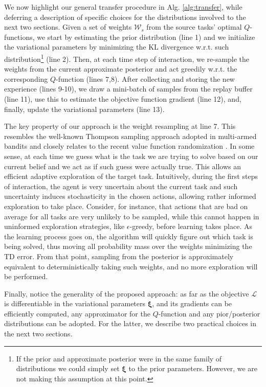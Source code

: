 \documentclass{article}
\begin{document}
We now highlight our general transfer procedure in Alg. \ref{alg:transfer}, while deferring a description of specific choices for the distributions involved to the next two sections. Given a set of weights $\mathcal{W}_s$ from the source tasks' optimal $Q$-functions, we start by estimating the prior distribution (line 1) and we initialize the variational parameters by minimizing the KL divergence w.r.t. such distribution\footnote{If the prior and approximate posterior were in the same family of distributions we could simply set $\bm{\xi}$ to the prior parameters. However, we are not making this assumption at this point.} (line 2). Then, at each time step of interaction, we re-sample the weights from the current approximate posterior and act greedily w.r.t. the corresponding $Q$-function (lines 7,8). After collecting and storing the new experience (lines 9-10), we draw a mini-batch of samples from the replay buffer (line 11), use this to estimate the objective function gradient (line 12), and, finally, update the variational parameters (line 13).

The key property of our approach is the weight resampling at line 7. This resembles the well-known Thompson sampling approach adopted in multi-armed bandits \cite{bubeck2012regret} and closely relates to the recent value function randomization \cite{osband2014generalization}. In some sense, at each time we guess what is the task we are trying to solve based on our current belief and we act as if such guess were actually true. This allows an efficient adaptive exploration of the target task. Intuitively, during the first steps of interaction, the agent is very uncertain about the current task and such uncertainty induces stochasticity in the chosen actions, allowing rather informed exploration to take place. Consider, for instance, that actions that are bad on average for all tasks are very unlikely to be sampled, while this cannot happen in uninformed exploration strategies, like $\epsilon$-greedy, before learning takes place. As the learning process goes on, the algorithm will quickly figure out which task is being solved, thus moving all probability mass over the weights minimizing the TD error. From that point, sampling from the posterior is approximately equivalent to deterministically taking such weights, and no more exploration will be performed. 

Finally, notice the generality of the proposed approach: as far as the objective $\mathcal{L}$ is differentiable in the variational parameters $\bm{\xi}$, and its gradients can be efficiently computed, any approximator for the $Q$-function and any pior/posterior distributions can be adopted. For the latter, we describe two practical choices in the next two sections.
\end{document}
